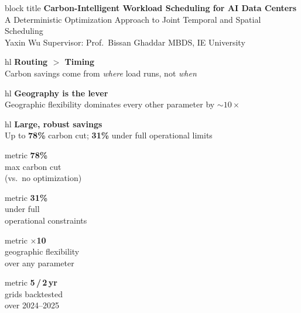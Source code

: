 \documentclass[final]{beamer}
\newlength{\colw}\setlength{\colw}{0.312\paperwidth}
\newlength{\colht}\setlength{\colht}{0.845\paperheight}  %
\newcommand{\metric}[2]{%
\begin{minipage}{0.235\paperwidth}\centering
\begin{beamercolorbox}[wd=\linewidth,sep=0.3cm,center,rounded=true]{metric}
{\fontsize{42}{48}\selectfont\bfseries #1}\\[0.8mm]{\small #2}
\end{beamercolorbox}\end{minipage}}
\newcommand{\finding}[2]{%
\begin{minipage}{0.315\paperwidth}\centering
\begin{beamercolorbox}[wd=\linewidth,sep=0.3cm,rounded=true]{hl}
{\fontsize{22}{26}\selectfont\bfseries #1}\\[1mm]{\small #2}
\end{beamercolorbox}\end{minipage}}
\begin{document}
\begin{frame}[t]{}

\begin{beamercolorbox}[wd=\paperwidth,sep=0.8cm]{block title}
\centering
{\fontsize{60}{68}\selectfont\bfseries Carbon-Intelligent Workload Scheduling for AI Data Centers}\\[3.5mm]
{\fontsize{30}{36}\selectfont A Deterministic Optimization Approach to Joint Temporal and Spatial Scheduling}\\[4.5mm]
{\large Yaxin Wu \quad\textbullet\quad Supervisor: Prof.\ Bissan Ghaddar \quad\textbullet\quad MBDS, IE University}
\end{beamercolorbox}
\vspace{0.28cm}

\centering
\finding{Routing $>$ Timing}{Carbon savings come from \emph{where} load runs, not \emph{when}}\hfill
\finding{Geography is the lever}{Geographic flexibility dominates every other parameter by $\sim\!10\times$}\hfill
\finding{Large, robust savings}{Up to \textbf{78\%} carbon cut; \textbf{31\%} under full operational limits}
\vspace{0.18cm}

\metric{78\%}{max carbon cut\\(vs.\ no optimization)}\hfill
\metric{31\%}{under full\\operational constraints}\hfill
\metric{$\times$10}{geographic flexibility\\over any parameter}\hfill
\metric{5\,/\,2\,yr}{grids backtested\\over 2024--2025}
\vspace{0.16cm}

\begin{columns}[t]

\begin{column}{\colw}
\begin{minipage}[t][\colht]{\linewidth}


\end{minipage}
\end{column}
\end{columns}
\end{frame}
\end{document}

